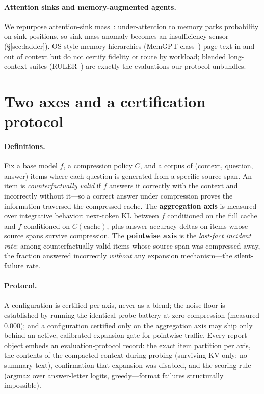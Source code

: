 \documentclass[11pt]{article}
\newcommand{\lostfact}{lost-fact incident rate}
\begin{document}
\paragraph{Attention sinks and memory-augmented agents.} We repurpose
attention-sink mass~\citep{xiao2024streamingllm}: under-attention to memory
parks probability on sink positions, so sink-mass anomaly becomes an
insufficiency sensor (\S\ref{sec:ladder}). OS-style memory hierarchies
(MemGPT-class~\citep{packer2023memgpt}) page text in and out of context but
do not certify fidelity or route by workload; blended long-context suites
(RULER~\citep{hsieh2024ruler}) are exactly the evaluations our protocol
unbundles.

\section{Two axes and a certification protocol}
\label{sec:protocol}

\paragraph{Definitions.} Fix a base model $f$, a compression policy $C$, and
a corpus of (context, question, answer) items where each question is
generated from a specific source span. An item is \emph{counterfactually
valid} if $f$ answers it correctly with the context and incorrectly without
it---so a correct answer under compression proves the information traversed
the compressed cache. The \textbf{aggregation axis} is measured over
integrative behavior: next-token KL between $f$ conditioned on the full
cache and $f$ conditioned on $C(\text{cache})$, plus answer-accuracy deltas
on items whose source spans survive compression. The \textbf{pointwise
axis} is the \emph{\lostfact}: among counterfactually valid items whose
source span was compressed away, the fraction answered incorrectly
\emph{without} any expansion mechanism---the silent-failure rate.

\paragraph{Protocol.} A configuration is certified per axis, never as a
blend; the noise floor is established by running the identical probe battery
at zero compression (measured $0.000$); and a configuration certified only
on the aggregation axis may ship only behind an active, calibrated expansion
gate for pointwise traffic. Every report object embeds an
evaluation-protocol record: the exact item partition per axis, the contents
of the compacted context during probing (surviving KV only; no summary
text), confirmation that expansion was disabled, and the scoring rule
(argmax over answer-letter logits, greedy---format failures structurally
impossible).
\end{document}
